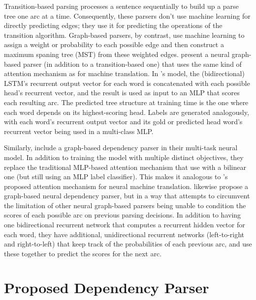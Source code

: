 \documentclass[11pt,a4paper]{article}
\begin{document}
Transition-based parsing processes a sentence sequentially to build up a parse tree one arc at a time. Consequently, these parsers don't use machine learning for directly predicting edges; they use it for predicting the operations of the transition algorithm. Graph-based parsers, by contrast, use machine learning to assign a weight or probability to each possible edge and then construct a maximum spaning tree (MST) from these weighted edges.  \citet{KiperwasserGoldberg2016} present a neural graph-based parser (in addition to a transition-based one) that uses the same kind of attention mechanism as \citet{BahdanauChoBengio2014} for machine translation. In \citeauthor{KiperwasserGoldberg2016}'s \citeyear{KiperwasserGoldberg2016} model, the (bidirectional) LSTM's recurrent output vector for each word is concatenated with each possible head's recurrent vector, and the result is used as input to an MLP that scores each resulting arc. The predicted tree structure at training time is the one where each word depends on its highest-scoring head. Labels are generated analogously, with each word's recurrent output vector and its gold or predicted head word's recurrent vector being used in a multi-class MLP.

Similarly, \citet{Hashimotoetal2016} include a graph-based dependency parser in their multi-task neural model. In addition to training the model with multiple distinct objectives, they replace the traditional MLP-based attention mechanism that \citet{KiperwasserGoldberg2016} use with a bilinear one (but still using an MLP label classifier). This makes it analogous to \citeauthor{Luongetal2015}'s \citeyear{Luongetal2015} proposed attention mechanism for neural machine translation. \citet{Chengetal2016} likewise propose a graph-based neural dependency parser, but in a way that attempts to circumvent the limitation of other neural graph-based parsers being unable to condition the scores of each possible arc on previous parsing decisions. In addition to having one bidirectional recurrent network that computes a recurrent hidden vector for each word, they have additional, unidirectional recurrent networks (left-to-right and right-to-left) that keep track of the probabilities of each previous arc, and use these together to predict the scores for the next arc.

\section{Proposed Dependency Parser}\label{architecture}
\end{document}
